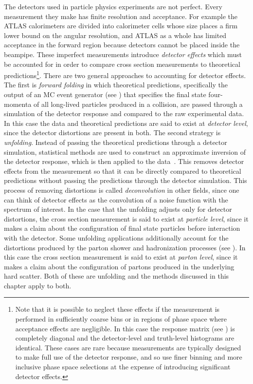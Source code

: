The detectors used in particle physics experiments are not perfect.
Every measurement they make has finite resolution and acceptance.
For example the ATLAS calorimeters are divided into calorimeter cells whose size places a firm lower bound on the angular resolution, and ATLAS as a whole has limited acceptance in the forward region because detectors cannot be placed inside the beampipe.
These imperfect measurements introduce \textit{detector effects} which must be accounted for in order to compare cross section measurements to theoretical predictions\footnote{Note that it is possible to neglect these effects if the measurement is performed in sufficiently coarse bins or in regions of phase space where acceptance effects are negligible. In this case the response matrix (see ) is completely diagonal and the detector-level and truth-level histograms are identical. These cases are rare because measurements are typically designed to make full use of the detector response, and so use finer binning and more inclusive phase space selections at the expense of introducing significant detector effects.}.
There are two general approaches to accounting for detector effects.
The first is \textit{forward folding} in which theoretical predictions, specifically the output of an MC event generator (see ) that specifies the final state four-momenta of all long-lived particles produced in a collision, are passed through a simulation of the detector response and compared to the raw experimental data.
In this case the data and theoretical predictions are said to exist at \textit{detector level}, since the detector distortions are present in both.
The second strategy is \textit{unfolding}.
Instead of passing the theoretical predictions through a detector simulation, statistical methods are used to construct an approximate inversion of the detector response, which is then applied to the data~\cite{Cowan:2002in}.
This removes detector effects from the measurement so that it can be directly compared to theoretical predictions without passing the predictions through the detector simulation.
This process of removing distortions is called \textit{deconvolution} in other fields, since one can think of detector effects as the convolution of a noise function with the spectrum of interest.
In the case that the unfolding adjusts only for detector distortions, the cross section measurement is said to exist at \textit{particle level}, since it makes a claim about the configuration of final state particles before interaction with the detector.
Some unfolding applications additionally account for the distortions produced by the parton shower and hadronization processes (see ).
In this case the cross section measurement is said to exist at \textit{parton level}, since it makes a claim about the configuration of partons produced in the underlying hard scatter.
Both of these are unfolding and the methods discussed in this chapter apply to both.

